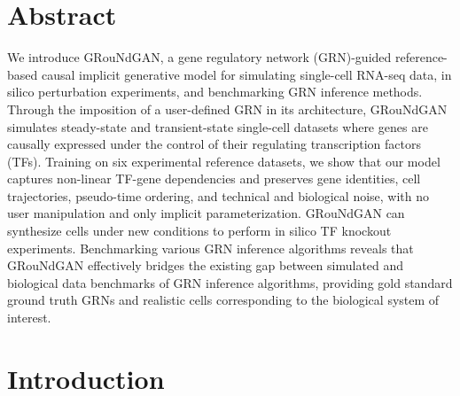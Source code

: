 \renewcommand{\thetable}{\arabic{table}}
\renewcommand{\thefigure}{\arabic{figure}}


\section*{Abstract}

We introduce GRouNdGAN, a gene regulatory network (GRN)-guided reference-based causal implicit generative model for simulating single-cell RNA-seq data, in silico perturbation experiments, and benchmarking GRN inference methods. Through the imposition of a user-defined GRN in its architecture, GRouNdGAN simulates steady-state and transient-state single-cell datasets where genes are causally expressed under the control of their regulating transcription factors (TFs). Training on six experimental reference datasets, we show that our model captures non-linear TF-gene dependencies and preserves gene identities, cell trajectories, pseudo-time ordering, and technical and biological noise, with no user manipulation and only implicit parameterization. GRouNdGAN can synthesize cells under new conditions to perform in silico TF knockout experiments. Benchmarking various GRN inference algorithms reveals that GRouNdGAN effectively bridges the existing gap between simulated and biological data benchmarks of GRN inference algorithms, providing gold standard ground truth GRNs and realistic cells corresponding to the biological system of interest.


\section*{Introduction}

